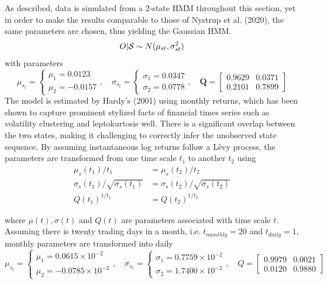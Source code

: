 As described, data is simulated from a 2-state HMM throughout this section, yet in order to make the results comparable to those of Nystrup et al. (2020), the same parameters are chosen, thus yielding the Gaussian HMM.
\begin{equation*}
    O|\S \sim N(\mu_{st}, \sigma_{st}^2)
\end{equation*}
with parameters
$$
    \mu_{s_t}=
    \begin{cases}
        \mu_1= 0.0123 \\
        \mu_2= -0.0157
    \end{cases}, \quad
    \sigma_{s_t} =
    \begin{cases}
        \sigma_1 = 0.0347 \\
        \sigma_2 = 0.0778
    \end{cases}, \quad
    \mathbf{Q} = 
    \begin{bmatrix}
        0.9629 & 0.0371 \\
        0.2101 & 0.7899
    \end{bmatrix}
$$
The model is estimated by Hardy's (2001) using monthly returns, which has been shown to capture prominent stylized facts of financial times series such as volatility clustering and leptokurtosis well. There is a significant overlap between the two states, making it challenging to correctly infer the unobserved state sequence. By assuming instantaneous log returns follow a Lêvy process, the parameters are transformed from one time scale $t_1$ to another $t_2$ using
\begin{align*}
    \mu_s(t_1) / t_1 &= \mu_s(t_2) / t_2 \\
    \sigma_s(t_1) / \sqrt{\sigma_s(t_1)} &= \sigma_s(t_2) / \sqrt{\sigma_s(t_2)} \\
    Q(t_1)^{1/t_1} &= Q(t_2)^{1/t_2}
\end{align*}

where $\mu(t), \sigma(t)$ and $Q(t)$ are parameters associated with time scale $t$. Assuming there is twenty trading days in a month, i.e. $t_{monthly}=20$ and $t_{daily}=1$, monthly parameters are transformed into daily
$$
    \mu_{s_t}=
    \begin{cases}
        \mu_1= 0.0615 \times 10^{-2} \\
        \mu_2= -0.0785 \times 10^{-2}
    \end{cases}, \quad
    \sigma_{s_t} =
    \begin{cases}
        \sigma_1 = 0.7759 \times 10^{-2} \\
        \sigma_2 = 1.7400 \times 10^{-2}
    \end{cases}, \quad
    Q = 
    \begin{bmatrix}
        0.9979 & 0.0021 \\
        0.0120 & 0.9880
    \end{bmatrix}
$$

